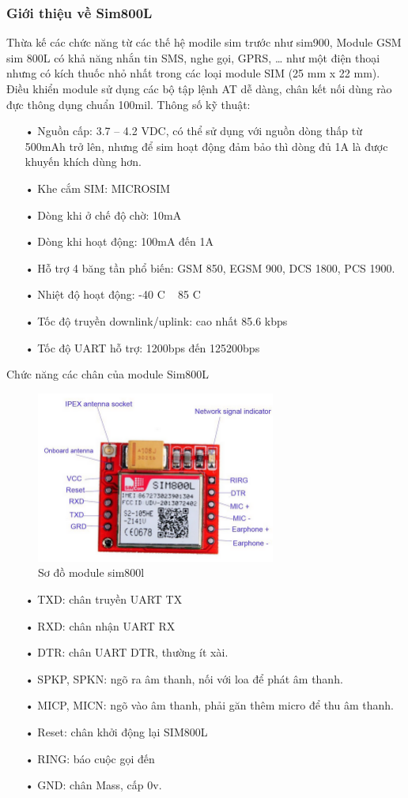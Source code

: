 \subsubsection*{Giới thiệu về Sim800L}
Thừa kế các chức năng từ các thế hệ modile sim trước như sim900, Module GSM sim 800L có khả năng nhắn tin SMS, nghe gọi, GPRS, … như một điện thoại nhưng có kích thuốc nhỏ nhất trong các loại module SIM (25 mm x 22 mm). Điều khiển module sử dụng các bộ tập lệnh AT dễ dàng, chân kết nối dùng rào đực thông dụng chuẩn 100mil.
Thông số kỹ thuật:
\begin{itemize}

\item[•]Nguồn cấp: 3.7 – 4.2 VDC, có thể sử dụng với nguồn dòng thấp từ 500mAh trở lên, nhưng để sim hoạt động đảm bảo thì dòng đủ 1A là được khuyến khích dùng hơn.
\item[•]Khe cắm SIM: MICROSIM
\item[•]Dòng khi ở chế độ chờ: 10mA
\item[•]Dòng khi hoạt động: 100mA đến 1A
\item[•]Hỗ trợ 4 băng tần phổ biến: GSM 850, EGSM 900, DCS 1800, PCS 1900.
\item[•]Nhiệt độ hoạt động: -40 C ~ 85 C
\item[•]Tốc độ truyền downlink/uplink: cao nhất 85.6 kbps
\item[•]Tốc độ UART hỗ trợ: 1200bps đến 125200bps
\end{itemize}

Chức năng các chân của module Sim800L
\begin{figure}[H]
\centering    
\includegraphics[width=0.7\textwidth]{sim800l}
\caption[Sơ đồ module sim800l]{Sơ đồ module sim800l}
\label{fig:sim800l}
\end{figure}

\begin{itemize}
\item[•]TXD: chân truyền UART TX
\item[•]RXD: chân nhận UART RX
\item[•]DTR: chân UART DTR, thường ít xài.
\item[•]SPKP, SPKN: ngõ ra âm thanh, nối với loa để phát âm thanh.
\item[•]MICP, MICN: ngõ vào âm thanh, phải găn thêm micro để thu âm thanh.
\item[•]Reset: chân khởi động lại SIM800L
\item[•]RING: báo cuộc gọi đến
\item[•]GND: chân Mass, cấp 0v.
\end{itemize}

